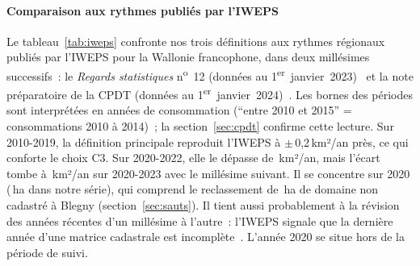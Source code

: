 \documentclass[11pt,a4paper]{report}
\newcommand{\ha}{\,ha}
\newcommand{\kmdan}{\,km²/an}
\begin{document}
\paragraph{Comparaison aux rythmes publiés par l'IWEPS}
\label{sec:iweps}
Le tableau~\ref{tab:iweps} confronte nos trois définitions aux rythmes régionaux publiés par l'IWEPS pour la Wallonie francophone, dans deux millésimes successifs~: le \emph{Regards statistiques} n\textsuperscript{o}~12 (données au 1\textsuperscript{er}~janvier~2023)~\citep{iweps_rs12} et la note préparatoire de la CPDT (données au 1\textsuperscript{er}~janvier~2024)~\citep{cpdt_prep2025}. Les bornes des périodes sont interprétées en années de consommation (\enquote{entre 2010 et 2015} = consommations 2010 à 2014)~; la section~\ref{sec:cpdt} confirme cette lecture. Sur 2010-2019, la définition principale reproduit l'IWEPS à $\pm$\,0,2\kmdan{} près, ce qui conforte le choix C3. Sur 2020-2022, elle le dépasse de \IwepsEcartRecent\kmdan, mais l'écart tombe à \IwepsEcartQuatre\kmdan{} sur 2020-2023 avec le millésime suivant. Il se concentre sur 2020 (\PrincDeuxMilleVingt\ha{} dans notre série), qui comprend le reclassement de \BlegnyNC\ha{} de domaine non cadastré à Blegny (section~\ref{sec:sauts}). Il tient aussi probablement à la révision des années récentes d'un millésime à l'autre~: l'IWEPS signale que la dernière année d'une matrice cadastrale est incomplète~\citep{iweps_rs12}. L'année 2020 se situe hors de la période de suivi.

\begin{table}[ht]
\centering\small
\caption{Rythme annuel moyen d'artificialisation nette (km²/an), Wallonie hors Communauté germanophone~: IWEPS (deux millésimes) et définitions cadastrales de l'étude.}
\label{tab:iweps}

\end{table}
\end{document}
